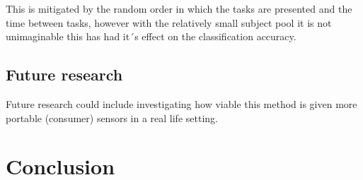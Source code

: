 \documentclass[12pt,fleqn,leqno,letterpaper]{article}
\begin{document}
This is mitigated by the random order in which the tasks are presented and the time between tasks, however with the relatively small subject pool it is not unimaginable this has had it´s effect on the classification accuracy.




\subsection{Future research}
Future research could include investigating how viable this method is given more portable (consumer) sensors in a real life setting. 

\section{Conclusion}





{}

\end{document}
